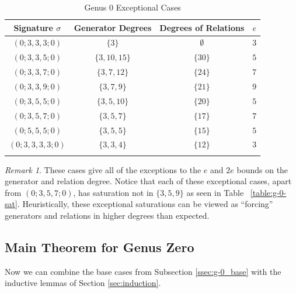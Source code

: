 \documentclass{amsart}
\theoremstyle{plain}
\theoremstyle{definition}
\theoremstyle{remark}
\newtheorem{rem}[thm]{Remark}
\numberwithin{equation}{section}
\newcommand\ssec{\subsection}
\begin{document}
\begin{longtable}
	{| c || c | c | c |}
	\hline
	Signature $\sigma$ & Generator Degrees & Degrees of Relations & $e$ \\
	\hline
	\hline

	$(0; 3, 3, 3; 0)$ & $\{3\}$ & $\emptyset$ & $3$ \\	\hline

	$(0; 3, 3, 5; 0)$ & $\{3, 10, 15\}$ & $\{30\}$ & $5$ \\	\hline
	
	$(0; 3, 3, 7; 0)$ & $\{3, 7, 12\}$ & $\{24\}$ & $7$ \\	\hline
	
	$(0; 3, 3, 9; 0)$ & $\{3, 7, 9\}$ & $\{21\}$ & $9$ \\	\hline
	
	$(0; 3, 5, 5; 0)$ & $\{3, 5, 10\}$ & $\{20\}$ & $5$ \\	\hline
	
	$(0; 3, 5, 7; 0)$ & $\{3, 5, 7\}$ & $\{17\}$ & $7$ \\	\hline
	
	$(0; 5, 5, 5; 0)$ & $\{3, 5, 5\}$ & $\{15\}$ & $5$ \\	\hline
	
	$(0; 3, 3, 3, 3; 0)$ & $\{3, 3, 4\}$ & $\{12\}$ & $3$ \\	\hline
	
	\caption{Genus 0 Exceptional Cases}
	\label{table:g-0-exceptional}
\end{longtable}

\begin{rem}
These cases give all of the exceptions to the $e$ and $2e$ bounds on
the generator and relation degree. Notice that each of these
exceptional cases, apart from $(0; 3, 5, 7; 0)$, has saturation not in $\{3, 5, 9\}$ as seen in Table ~\ref{table:g-0-sat}.
Heuristically, 
these exceptional saturations can be viewed as ``forcing'' generators and relations in higher degrees than expected.
\end{rem}

\ssec{Main Theorem for Genus Zero}
\label{ssec:g-0-main}
Now we can combine the base cases from Subsection \ref{ssec:g-0_base} with the inductive lemmas of Section \ref{sec:induction}.
\end{document}
